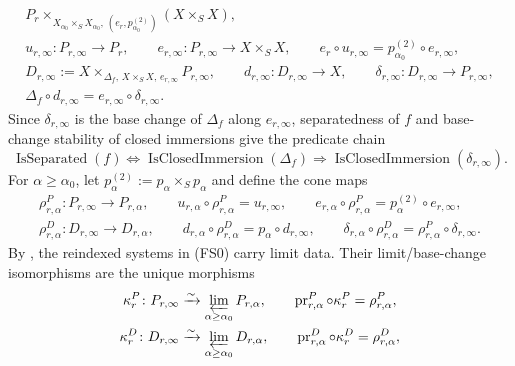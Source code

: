 \begin{definition}
\[\begin{gathered}
      P_r\times_{X_{\alpha_0}\times_SX_{\alpha_0},\,
        (e_r,p_{\alpha_0}^{(2)})}(X\times_SX),\\
    u_{r,\infty}\colon P_{r,\infty}\to P_r,\qquad
    e_{r,\infty}\colon P_{r,\infty}\to X\times_SX,\qquad
    e_r\circ u_{r,\infty}=p_{\alpha_0}^{(2)}\circ e_{r,\infty},\\
    D_{r,\infty}:=
      X\times_{\Delta_f,\,X\times_SX,\,e_{r,\infty}}P_{r,\infty},
    \qquad
    d_{r,\infty}\colon D_{r,\infty}\to X,
    \qquad
    \delta_{r,\infty}\colon D_{r,\infty}\to P_{r,\infty},\\
    \Delta_f\circ d_{r,\infty}
      =e_{r,\infty}\circ\delta_{r,\infty}.
  \end{gathered}                                                  \tag{FS1}
  \]
  Since $\delta_{r,\infty}$ is the base change of $\Delta_f$ along
  $e_{r,\infty}$, separatedness of $f$ and base-change stability of closed
  immersions give the predicate chain
  \[
    \operatorname{IsSeparated}(f)
      \Longleftrightarrow
    \operatorname{IsClosedImmersion}(\Delta_f)
      \Longrightarrow
    \operatorname{IsClosedImmersion}(\delta_{r,\infty}).         \tag{FS2}
  \]
  For $\alpha\geq\alpha_0$, let
  $p^{(2)}_\alpha:=p_\alpha\times_Sp_\alpha$ and define the cone maps
  \[
  \begin{gathered}
    \rho^P_{r,\alpha}\colon P_{r,\infty}\to P_{r,\alpha},\qquad
    u_{r,\alpha}\circ\rho^P_{r,\alpha}=u_{r,\infty},\qquad
    e_{r,\alpha}\circ\rho^P_{r,\alpha}
      =p^{(2)}_\alpha\circ e_{r,\infty},\\
    \rho^D_{r,\alpha}\colon D_{r,\infty}\to D_{r,\alpha},\qquad
    d_{r,\alpha}\circ\rho^D_{r,\alpha}
      =p_\alpha\circ d_{r,\infty},\qquad
    \delta_{r,\alpha}\circ\rho^D_{r,\alpha}
      =\rho^P_{r,\alpha}\circ\delta_{r,\infty}.
  \end{gathered}                                                  \tag{FS3}
  \]
  By
  , the reindexed
  systems in (FS0) carry limit data.  Their limit/base-change isomorphisms
  are the unique morphisms
  \[
  \begin{gathered}
    \kappa^P_r\colon P_{r,\infty}
      \xrightarrow{\sim}\varprojlim_{\alpha\geq\alpha_0}P_{r,\alpha},
    \qquad \operatorname{pr}^P_{r,\alpha}\circ\kappa^P_r
      =\rho^P_{r,\alpha},\\
    \kappa^D_r\colon D_{r,\infty}
      \xrightarrow{\sim}\varprojlim_{\alpha\geq\alpha_0}D_{r,\alpha},
    \qquad \operatorname{pr}^D_{r,\alpha}\circ\kappa^D_r
      =\rho^D_{r,\alpha},\\

\end{gathered}\]
\end{definition}
